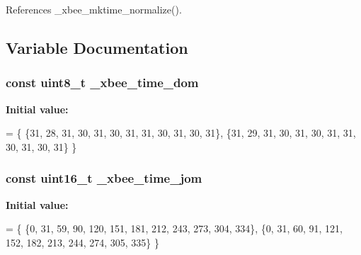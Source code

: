 References \-\_\-xbee\-\_\-mktime\-\_\-normalize().



\subsection{Variable Documentation}
\hypertarget{group__xbee__time_ga99177a6421e20c7ae299044223f19818}{
\subsubsection[{\-\_\-xbee\-\_\-time\-\_\-dom}]{\setlength{\rightskip}{0pt plus 5cm}const {\bf uint8\-\_\-t} \-\_\-xbee\-\_\-time\-\_\-dom}}\label{group__xbee__time_ga99177a6421e20c7ae299044223f19818}
{\bfseries Initial value\-:}
\begin{DoxyCode}
=
\{
   \{31, 28, 31, 30, 31, 30, 31, 31, 30, 31, 30, 31\},        
   \{31, 29, 31, 30, 31, 30, 31, 31, 30, 31, 30, 31\}         
\}
\end{DoxyCode}
\hypertarget{group__xbee__time_ga85d445ee223b8e72bded9b5f19f7e45c}{
\subsubsection[{\-\_\-xbee\-\_\-time\-\_\-jom}]{\setlength{\rightskip}{0pt plus 5cm}const {\bf uint16\-\_\-t} \-\_\-xbee\-\_\-time\-\_\-jom}}\label{group__xbee__time_ga85d445ee223b8e72bded9b5f19f7e45c}
{\bfseries Initial value\-:}
\begin{DoxyCode}
=
\{
   \{0, 31, 59, 90, 120, 151, 181, 212, 243, 273, 304, 334\},    
   \{0, 31, 60, 91, 121, 152, 182, 213, 244, 274, 305, 335\}     
\}
\end{DoxyCode}
